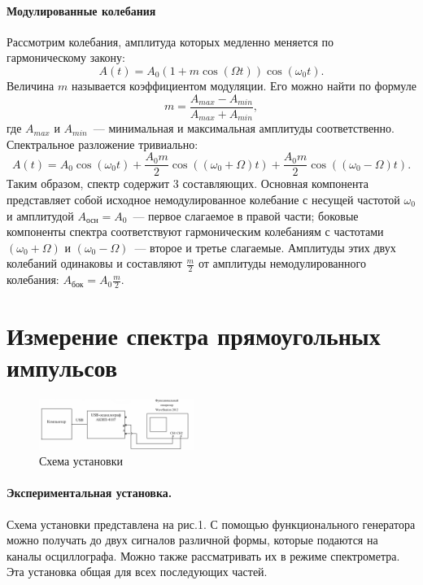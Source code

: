 \documentclass[12pt,a4paper]{article}
\begin{document}
\paragraph{Модулированные колебания} Рассмотрим колебания, амплитуда которых медленно меняется по гармоническому закону:
\begin{equation}
A(t) = A_0(1+m\cos(\Omega t))\cos(\omega_0 t).
\end{equation}
Величина $m$ называется коэффициентом модуляции. Его можно найти по формуле
\begin{equation}
m = \frac{A_{max} - A_{min}}{A_{max} + A_{min}},
\end{equation}
где $A_{max}$ и $A_{min}$~--- минимальная и максимальная амплитуды соответственно. Спектральное разложение тривиально:
\begin{equation}
A(t) = A_0\cos(\omega_0 t) + \frac{A_0 m}{2}\cos((\omega_0 + \Omega)t) + \frac{A_0 m}{2}\cos((\omega_0 - \Omega)t).
\end{equation}
Таким образом, спектр содержит 3 составляющих. Основная компонента представляет собой исходное немодулированное колебание с несущей частотой $\omega_0$ и амплитудой $A_\text{осн}=A_0$~--- первое слагаемое в правой части; боковые компоненты спектра соответствуют гармоническим колебаниям с частотами $(\omega_0+\Omega)$ и $(\omega_0-\Omega)$~--- второе и третье слагаемые. Амплитуды этих двух колебаний одинаковы и составляют $\frac{m}{2}$ от амплитуды немодулированного колебания: $A_\text{бок} = A_0\frac{m}{2}$.
\newpage
\section{Измерение спектра прямоугольных импульсов}
\begin{figure}
\centering\includegraphics[width = 0.45\textwidth]{Pct1}
\captionsetup{justification = centering}
\caption{Схема установки \label{Pct1}}
\end{figure}
\paragraph{Экспериментальная установка.} Схема установки представлена на рис.1. С помощью функционального генератора можно получать до двух сигналов различной формы, которые подаются на каналы осциллографа. Можно также рассматривать их в режиме спектрометра. Эта установка общая для всех последующих частей.
\end{document}
